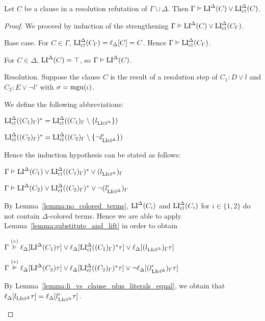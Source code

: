 \documentclass[,%
	draft=false,%
	numbers=noendperiod
	11pt,
	a4paper,
	oneside,%
	openany,
]{memoir}
\begin{document}
\begin{lemma}
	\label{old:lemma:gamma_entails_lide}
	Let $C$ be a clause in a resolution refutation of $\Gamma\cup\Delta$. Then
	$\Gamma\vDash \operatorname{LI}^\Delta(C) \lor \operatorname{LI}_{\operatorname{cl}}^\Delta(C)$.
\end{lemma}
\begin{proof}
	We proceed by induction of the strengthening $\Gamma\vDash \operatorname{LI}^\Delta(C) \lor \operatorname{LI}_{\operatorname{cl}}^\Delta(C_\Gamma)$.

	\begin{description}
		\item{} Base case.
			For $C\in\Gamma$, $\operatorname{LI}_{\operatorname{cl}}^\Delta(C_\Gamma) = \ell_{\Delta}[C] = C$. Hence $\Gamma \vDash \operatorname{LI}_{\operatorname{cl}}^\Delta(C_\Gamma)$.

			For $C\in\Delta$, $\operatorname{LI}^\Delta(C) = \top$, so $\Gamma \vDash \operatorname{LI}^\Delta(C)$.

		\item{} Resolution.
			Suppose the clause $C$ is the result of a resolution step \inference{} of $C_1: D \lor l$ and $C_2: E \lor \lnot l'$ with $\sigma = \operatorname{mgu}(\iota)$.

			\newcommand{\clauseOnePrime}{\LIclde( (C_1)_\Gamma )^*}
			\newcommand{\clauseTwoPrime}{\LIclde( (C_2)_\Gamma )^*}

			We define the following abbreviations:

			$\clauseOnePrime = \LIclde( (C_1)_\Gamma \setminus \{l\cllde\} )$

			$\clauseTwoPrime = \LIclde( (C_2)_\Gamma \setminus \{\lnot l'\cllde\} )$

			Hence the induction hypothesis can be stated as follows:

			$\Gamma \entails \LIde(C_1) \lor \clauseOnePrime \lor (l\cllde)_\Gamma$

			$\Gamma \entails \LIde(C_2) \lor \clauseTwoPrime \lor \lnot (l'\cllde)_\Gamma$

			By Lemma~\ref{lemma:no_colored_terms}, $\operatorname{LI}^\Delta(C_i)$ and $\operatorname{LI}_{\operatorname{cl}}^\Delta(C_i)$ for $i\in\{1,2\}$ do not contain $\Delta$-colored terms. 
			Hence we are able to apply Lemma~\ref{lemma:substitute_and_lift} in order to obtain

			$\Gamma \stackrel\markA\entails \lifdeltanovar{\LIde(C_1)\tau} \lor \lifdeltanovar{\clauseOnePrime\tau} \lor \lifdeltanovar{(l\cllde)_\Gamma\tau}$

			$\Gamma \stackrel\markB\entails \lifdeltanovar{\LIde(C_2)\tau} \lor \lifdeltanovar{\clauseTwoPrime\tau} \lor \lnot \lifdeltanovar{(l'\cllde)_\Gamma\tau}$

			By Lemma~\ref{lemma:li_vs_clause_plus_literals_equal}, we obtain that
			$\ell_{\Delta}[l_{\operatorname{LIcl}^\Delta}\tau] = 
			\ell_{\Delta}[l'_{\operatorname{LIcl}^\Delta}\tau]$.


\end{description}
\end{proof}
\end{document}
